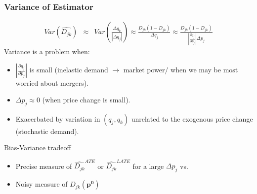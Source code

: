 \documentclass[xcolor=pdftex,dvipsnames,table,mathserif,aspectratio=169]{beamer}
\begin{document}
\begin{frame}
\frametitle{Variance of Estimator}
\footnotesize
\begin{eqnarray*}
Var(\widehat{D_{jk} })&\approx& Var\left( \frac{\Delta q_k}{|\Delta q_j|} \right)\approx \frac{D_{jk} (1-D_{jk})}{\Delta q_j} \approx \frac{D_{jk} (1-D_{jk})}{\left| \frac{\partial q_j}{\partial p_j} \right| \Delta p_j}
\end{eqnarray*}
\normalsize
Variance is a problem when:
\begin{itemize}
\item  $\left| \frac{\partial q_j}{\partial p_j} \right| $ is small (inelastic demand $\rightarrow$ market power/ when we may be most worried about mergers).
\item $\Delta p_j \approx 0 $ (when price change is small).
\item Exacerbated by variation in $(q_j,q_k)$ unrelated to the exogenous price change (stochastic demand).
\end{itemize}
Bias-Variance tradeoff
\begin{itemize}
\item Precise measure of $\widehat{D_{jk}}^{ATE}$ or $\widehat{D_{jk}}^{LATE}$ for a large $\Delta p_j$ vs.
\item Noisy measure of $D_{jk}(\mathbf{p^0})$
\end{itemize}
\end{frame}
\end{document}
